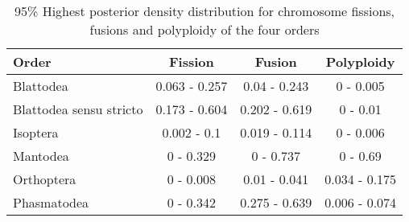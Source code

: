 \begin{table}[ht]
\centering
\begin{tabular}{lccc}
\hline
\textbf{Order}          & \textbf{Fission} & \textbf{Fusion} & \textbf{Polyploidy} \\ \hline
Blattodea               & 0.063 - 0.257    & 0.04 - 0.243    & 0 - 0.005           \\
Blattodea sensu stricto & 0.173 - 0.604    & 0.202 - 0.619   & 0 - 0.01            \\
Isoptera                & 0.002 - 0.1      & 0.019 - 0.114   & 0 - 0.006           \\
Mantodea                & 0 - 0.329        & 0 - 0.737       & 0 - 0.69            \\
Orthoptera              & 0 - 0.008        & 0.01 - 0.041    & 0.034 - 0.175       \\
Phasmatodea             & 0 - 0.342        & 0.275 - 0.639   & 0.006 - 0.074       \\ \hline
\end{tabular}
\caption{95\% Highest posterior density distribution for chromosome fissions, fusions and polyploidy of the four orders}
\label{tab:HPD}
\end{table}%